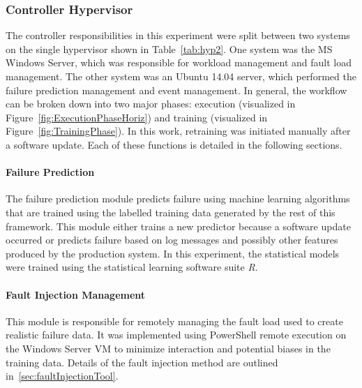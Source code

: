 \tabHypervisorOne
\tabHypervisorTwo

\setcounter{secnumdepth}{5}

\subsubsection{Controller Hypervisor} \label{sec:controller} %
The controller responsibilities in this experiment were split between two
systems on the single hypervisor shown in Table~\ref{tab:hyp2}.  One system was
the \ac{MS} Windows Server, which was responsible for workload management and
fault load management.  The other system was an Ubuntu 14.04 server, which
performed the failure prediction management and event management.  In general,
the workflow can be broken down into two major phases: execution (visualized in
Figure~\ref{fig:ExecutionPhaseHoriz}) and training (visualized in
Figure~\ref{fig:TrainingPhase}).  In this work, retraining was initiated
manually after a software update.  Each of these functions is detailed in the
following sections.


\paragraph{Failure Prediction} \label{sec:failurePrediction} %
The failure prediction module predicts failure using machine learning
algorithms that are trained using the labelled training data generated by the
rest of this framework.  This module either trains a new predictor because a
software update occurred or predicts failure based on log messages and possibly
other features produced by the production system.  In this experiment, the
statistical models were trained using the statistical learning software suite
\emph{R}.

\paragraph{Fault Injection Management} \label{sec:faultInjectionMgr}
This module is responsible for remotely managing the fault load used to create
realistic failure data.  It was implemented using PowerShell remote execution
on the Windows Server \ac{VM} to minimize interaction and potential biases in
the training data.  Details of the fault injection method are outlined
in~\ref{sec:faultInjectionTool}.

